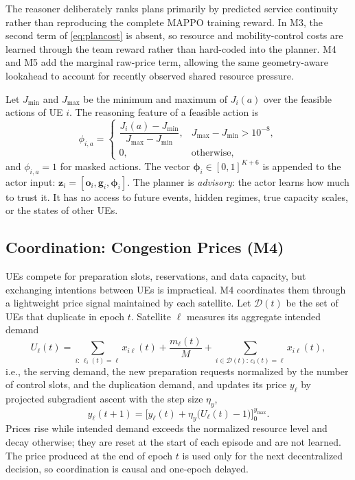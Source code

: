 \documentclass[journal]{IEEEtran}
\begin{document}
The reasoner deliberately ranks plans primarily by predicted service
continuity rather than reproducing the complete MAPPO training reward. In M3,
the second term of \eqref{eq:plancost} is absent, so resource and
mobility-control costs are learned through the team reward rather than
hard-coded into the planner. M4 and M5 add the marginal raw-price term,
allowing the same geometry-aware lookahead to account for recently observed
shared resource pressure.

Let $J_{\min}$ and $J_{\max}$ be the minimum and maximum of $J_i(a)$ over the
feasible actions of UE $i$. The reasoning feature of a feasible action is
\begin{equation}
\phi_{i,a}=
\begin{cases}
\dfrac{J_i(a)-J_{\min}}{J_{\max}-J_{\min}}, & J_{\max}-J_{\min}>10^{-8},\\[6pt]
0, & \text{otherwise},
\end{cases}
\label{eq:reasoning_feature}
\end{equation}
and $\phi_{i,a}=1$ for masked actions. The vector
$\boldsymbol\phi_i\in[0,1]^{K+6}$ is appended to the actor input:
$\mathbf{z}_i=[\mathbf{o}_i,\mathbf{g}_i,\boldsymbol\phi_i]$. The planner is
\emph{advisory}: the actor learns how much to trust it. It has no access to
future events, hidden regimes, true capacity scales, or the states of other
UEs.

\subsection{Coordination: Congestion Prices (M4)}
\label{sec:coord}

UEs compete for preparation slots, reservations, and data capacity, but
exchanging intentions between UEs is impractical. M4 coordinates them through
a lightweight price signal maintained by each satellite. Let $\mathcal{D}(t)$
be the set of UEs that duplicate in epoch $t$. Satellite $\ell$ measures its
aggregate intended demand
\begin{equation}
U_\ell(t)=\sum_{i:\,\ell_i(t)=\ell}x_{i\ell}(t)+\frac{m_\ell(t)}{M}+\sum_{i\in\mathcal{D}(t):\,c_i(t)=\ell}x_{i\ell}(t),
\end{equation}
i.e., the serving demand, the new preparation requests normalized by the
number of control slots, and the duplication demand, and updates its price
$y_\ell$ by projected subgradient ascent with the step size $\eta_y$,
\begin{equation}
y_\ell(t+1)=\Big[y_\ell(t)+\eta_y\big(U_\ell(t)-1\big)\Big]_0^{y_{\max}}.
\label{eq:price}
\end{equation}
Prices rise while intended demand exceeds the normalized resource level and
decay otherwise; they are reset at the start of each episode and are not
learned. The price produced at the end of epoch $t$ is used only for the next
decentralized decision, so coordination is causal and one-epoch delayed.
\end{document}
